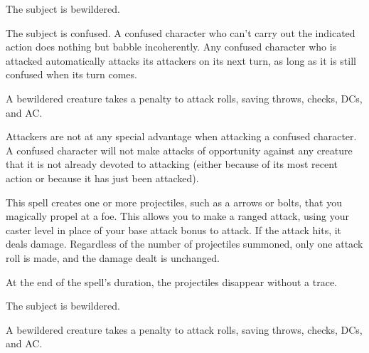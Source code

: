 \begin{spellhealthy}
The subject is bewildered.
\end{spellhealthy}
\begin{spellblood}
The subject is confused. \confusionexplanation A confused character who can't carry out the indicated action does nothing but babble incoherently. Any confused character who is attacked automatically attacks its attackers on its next turn, as long as it is still confused when its turn comes.
\end{spellblood}
\begin{spellnotes}
A bewildered creature takes a  penalty to attack rolls, saving throws, checks, DCs, and AC.
\par Attackers are not at any special advantage when attacking a confused character. A confused character will not make attacks of opportunity against any creature that it is not already devoted to attacking (either because of its most recent action or because it has just been attacked).
\end{spellnotes}

\spellrng{\rngmed}
\begin{spelleffect}
This spell creates one or more projectiles, such as a arrows or bolts, that you magically propel at a foe. This allows you to make a ranged attack, using your caster level in place of your base attack bonus to attack. If the attack hits, it deals damage. Regardless of the number of projectiles summoned, only one attack roll is made, and the damage dealt is unchanged.
\end{spelleffect}
\begin{spellnotes}
At the end of the spell's duration, the projectiles disappear without a trace.
\end{spellnotes}

\spellrng{\rngclose}
\spelldur{\durshort}
\begin{spellhealthy}
The subject is bewildered.
\end{spellhealthy}
\begin{spellnotes}
A bewildered creature takes a  penalty to attack rolls, saving throws, checks, DCs, and AC.
\end{spellnotes}

